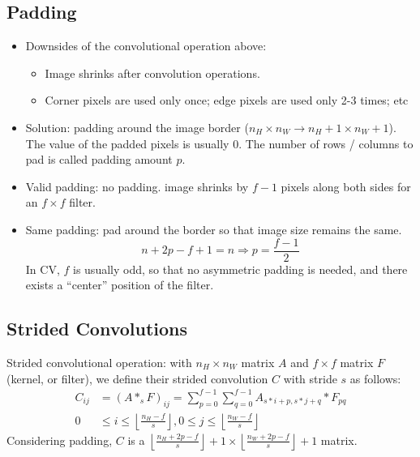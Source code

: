 \subsection{Padding}
\begin{itemize}
  \item Downsides of the convolutional operation above:
  \begin{itemize}
    \item Image shrinks after convolution operations.
    \item Corner pixels are used only once; edge pixels are used only 2-3 times; etc
  \end{itemize} 
  \item Solution: padding around the image border ($n_H\times n_W\rightarrow n_H+1\times n_W+1$). The value of the padded pixels is usually 0. The number of rows / columns to pad is called padding amount $p$.
  \item Valid padding: no padding. image shrinks by $f-1$ pixels along both sides for an $f\times f$ filter. 
  \item Same padding: pad around the border so that image size remains the same.
  \[n+2p-f+1=n\Rightarrow p=\frac{f-1}{2}\]
  In CV, $f$ is usually odd, so that no asymmetric padding is needed, and there exists a ``center'' position of the filter.
\end{itemize}
\subsection{Strided Convolutions}
Strided convolutional operation: with $n_H\times n_W$ matrix $A$ and $f\times f$ matrix $F$ (kernel, or filter), we define their strided convolution $C$ with stride $s$ as follows:
\begin{align*}
  C_{ij}&=\left(A*_sF\right)_{ij}=\displaystyle\sum_{p=0}^{f-1}\displaystyle\sum_{q=0}^{f-1}A_{s*i+p,s*j+q}*F_{pq}\\
  0&\le i\le \left\lfloor\frac{n_H-f}{s}\right\rfloor, 0\le j\le \left\lfloor\frac{n_W-f}{s}\right\rfloor
\end{align*}
Considering padding, $C$ is a $\left\lfloor\frac{n_H+2p-f}{s}\right\rfloor+1\times\left\lfloor\frac{n_W+2p-f}{s}\right\rfloor+1$ matrix.

